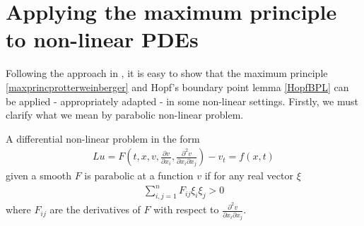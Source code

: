 \section{Applying the maximum principle to non-linear PDEs}
\label{non linear pde parabolic section}
Following the approach in \cite{protterweinberger}, it is easy to show that the maximum principle \ref{maxprincprotterweinberger} and Hopf's boundary point lemma \ref{HopfBPL} can be applied - appropriately adapted - in some non-linear settings.  Firstly, we must clarify what we mean by parabolic non-linear problem. 
\begin{defin}\label{nonlinearpde}
	A differential non-linear problem in the form 
	\begin{align}
		Lu= F\left(t, x, v, \frac{\partial v}{\partial x_i} , \frac{\partial^2 v}{\partial x_i \partial x_j}\right)-v_t = f(x, t)\label{nonlinearexample}
	\end{align} 
	given a smooth $F$ is parabolic at a function $v$ if for any real vector $\xi$
	\begin{align*}
		\sum_{i, j=1}^n F_{ij}\xi_i\xi_j >0
	\end{align*} 
	where $F_{ij}$ are the derivatives of $F$ with respect to $\frac{\partial^2 v}{\partial x_i \partial x_j}$. 
\end{defin}

